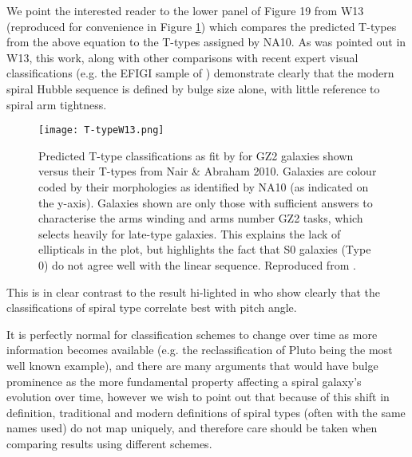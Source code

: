 \documentclass[usenatbib]{mn2e}
\begin{document}
We point the interested reader to the lower panel of Figure 19 from W13 (reproduced for convenience in Figure \ref{T-type}) which compares the predicted T-types from the above equation to the T-types assigned by NA10. As was pointed out in W13, this work, along with other comparisons with recent expert visual classifications (e.g. the EFIGI sample of \citealt{EFIGI}) demonstrate clearly that the modern spiral Hubble sequence is defined by bulge size alone, with little reference to spiral arm tightness. 

\begin{figure}
\texttt{[image: T-typeW13.png]}
\caption{Predicted T-type classifications as fit by \citet{Willett2013} for GZ2 galaxies shown versus their T-types from Nair \& Abraham 2010. Galaxies are colour coded by their morphologies as identified by NA10 (as indicated on the y-axis). Galaxies shown are only those with sufficient answers to characterise the arms winding and arms number GZ2 tasks, which selects heavily for late-type galaxies. This explains the lack of ellipticals in the plot, but highlights the fact that S0 galaxies (Type 0) do not agree well with the linear sequence. Reproduced from \citet{Willett2013}.  \label{T-type}}
\end{figure}

This is in clear contrast to the result hi-lighted in \citet{Kennicitt1981} who show clearly that the \citet{SandageTamman1981} classifications of spiral type correlate best with pitch angle. 

It is perfectly normal for classification schemes to change over time as more information becomes available (e.g. the reclassification of Pluto being the most well known example), and there are many arguments that would have bulge prominence as the more fundamental property affecting a spiral galaxy's evolution over time, however we wish to point out that because of this shift in definition, traditional and modern definitions of spiral types (often with the same names used) do not map uniquely, and therefore care should be taken when comparing results using different schemes.  

\end{document}
